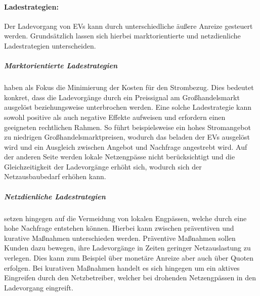 \paragraph{Ladestrategien:}

Der Ladevorgang von \glspl{EV} kann durch unterschiedliche äußere Anreize gesteuert werden. Grundsätzlich lassen sich hierbei marktorientierte und netzdienliche Ladestrategien unterscheiden.


\subparagraph{Marktorientierte Ladestrategien} haben als Fokus die Minimierung der Kosten für den Strombezug. Dies bedeutet konkret, dass die Ladevorgänge durch ein Preissignal am Großhandelsmarkt ausgelöst beziehungsweise unterbrochen werden. Eine solche Ladestrategie kann sowohl positive als auch negative Effekte aufweisen und erfordern einen geeigneten rechtlichen Rahmen. So führt beispielsweise ein hohes Stromangebot zu niedrigen Großhandelsmarktpreisen, wodurch das beladen der \glspl{EV} ausgelöst wird und ein Ausgleich zwischen Angebot und Nachfrage angestrebt wird. Auf der anderen Seite werden lokale Netzengpässe nicht berücksichtigt und die Gleichzeitigkeit der Ladevorgänge erhöht sich, wodurch sich der Netzausbaubedarf erhöhen kann. \cite{Agora2019} \cite{Dorendorf2019}



\subparagraph{Netzdienliche Ladestrategien} setzen hingegen auf die Vermeidung von lokalen Engpässen, welche durch eine hohe Nachfrage entstehen können. Hierbei kann zwischen präventiven und kurative Maßnahmen unterschieden werden. Präventive Maßnahmen sollen Kunden dazu bewegen, ihre Ladevorgänge in Zeiten geringer Netzauslastung zu verlegen. Dies kann zum Beispiel über monetäre Anreize aber auch über Quoten erfolgen. Bei kurativen Maßnahmen handelt es sich hingegen um ein aktives Eingreifen durch den Netzbetreiber, welcher bei drohenden Netzengpässen in den Ladevorgang eingreift. \cite{Agora2019}


